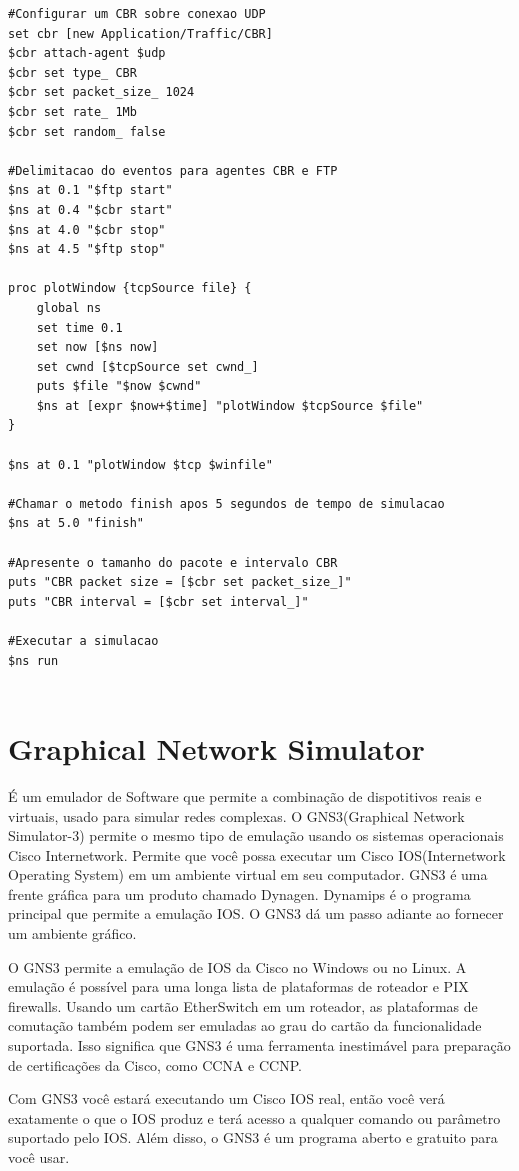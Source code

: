 \documentclass[12pt]{article}
\begin{document}
\begin{lstlisting}
#Configurar um CBR sobre conexao UDP
set cbr [new Application/Traffic/CBR]
$cbr attach-agent $udp
$cbr set type_ CBR
$cbr set packet_size_ 1024
$cbr set rate_ 1Mb
$cbr set random_ false

#Delimitacao do eventos para agentes CBR e FTP
$ns at 0.1 "$ftp start"
$ns at 0.4 "$cbr start"
$ns at 4.0 "$cbr stop"
$ns at 4.5 "$ftp stop"

proc plotWindow {tcpSource file} {
	global ns
	set time 0.1
	set now [$ns now]
	set cwnd [$tcpSource set cwnd_]
	puts $file "$now $cwnd"
	$ns at [expr $now+$time] "plotWindow $tcpSource $file"
}

$ns at 0.1 "plotWindow $tcp $winfile"

#Chamar o metodo finish apos 5 segundos de tempo de simulacao
$ns at 5.0 "finish"

#Apresente o tamanho do pacote e intervalo CBR
puts "CBR packet size = [$cbr set packet_size_]"
puts "CBR interval = [$cbr set interval_]"

#Executar a simulacao
$ns run


\end{lstlisting}

\section{Graphical Network Simulator}


É um emulador de Software que permite a combinação de dispotitivos reais e virtuais, usado para simular redes complexas. O GNS3(Graphical Network Simulator-3) permite o mesmo tipo de
emulação usando os sistemas operacionais Cisco Internetwork. Permite que você possa executar um Cisco IOS(Internetwork Operating System) em um ambiente virtual em seu computador. GNS3 é uma frente gráfica para um produto chamado Dynagen. Dynamips é o
programa principal que permite a emulação IOS. O GNS3 dá um passo adiante ao fornecer um ambiente gráfico.

O GNS3 permite a emulação de IOS da Cisco no Windows ou no Linux. A emulação é possível para uma longa lista de plataformas de roteador e PIX
firewalls. Usando um cartão EtherSwitch em um roteador, as plataformas de comutação também podem ser emuladas ao grau do cartão da funcionalidade suportada. Isso significa que GNS3 é uma ferramenta inestimável para
preparação de  certificações da Cisco, como CCNA e CCNP. 

Com GNS3 você estará executando um Cisco IOS real, então você verá exatamente o que o IOS produz e terá acesso a qualquer comando ou parâmetro suportado pelo IOS. Além disso, o GNS3 é um programa aberto e gratuito para você usar. 
\end{document}
